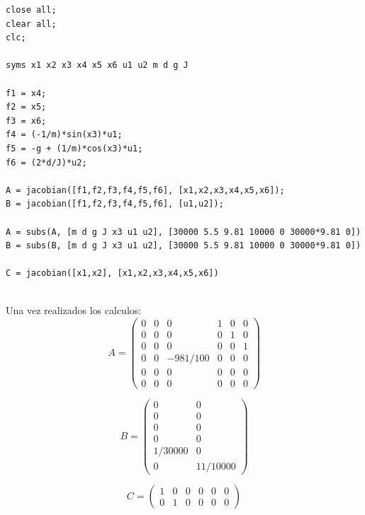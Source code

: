 \documentclass{article}
\begin{document}
\begin{itemize}
\begin{tcolorbox}
\begin{scriptsize}
\begin{verbatim}
close all;
clear all;
clc;

syms x1 x2 x3 x4 x5 x6 u1 u2 m d g J

f1 = x4;
f2 = x5;
f3 = x6;
f4 = (-1/m)*sin(x3)*u1;
f5 = -g + (1/m)*cos(x3)*u1;
f6 = (2*d/J)*u2;

A = jacobian([f1,f2,f3,f4,f5,f6], [x1,x2,x3,x4,x5,x6]);
B = jacobian([f1,f2,f3,f4,f5,f6], [u1,u2]);

A = subs(A, [m d g J x3 u1 u2], [30000 5.5 9.81 10000 0 30000*9.81 0])
B = subs(B, [m d g J x3 u1 u2], [30000 5.5 9.81 10000 0 30000*9.81 0])

C = jacobian([x1,x2], [x1,x2,x3,x4,x5,x6])


\end{verbatim}
\end{scriptsize}
\end{tcolorbox}

\bigskip

Una vez realizados los calculos:\\
	\begin{equation}A = 
		\begin{pmatrix}
		0 & 0 & 0 & 1 & 0 & 0\\
    		0 & 0 & 0 & 0 & 1 & 0\\
    		0 & 0 & 0 & 0 & 0 & 1\\
    		0 & 0 & -981/100 & 0 & 0 & 0\\
		0 & 0 & 0 & 0 & 0 & 0\\
    		0 & 0 & 0 & 0 & 0 & 0
		\end{pmatrix}
	\end{equation}
	
	\begin{equation}B = 
		\begin{pmatrix}
		0 & 0\\
    		0 & 0\\
    		0 & 0\\
    		0 & 0\\
    		1/30000 & 0\\
    		0 & 11/10000
		\end{pmatrix}
	\end{equation}
	
	\begin{equation}C = 
		\begin{pmatrix}
		1 & 0 & 0 & 0 & 0 & 0\\
     		0 & 1 & 0 & 0 & 0 & 0
		\end{pmatrix}
	\end{equation}\\
	

\end{itemize}
\end{document}
